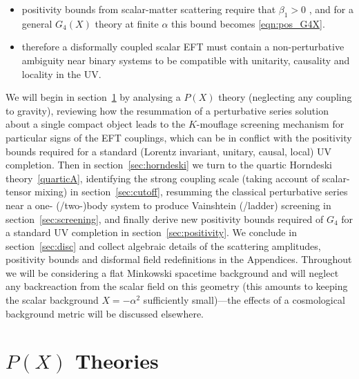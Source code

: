\documentclass[11pt]{article}
\begin{document}
\begin{itemize}
\begin{itemize}
\item positivity bounds from scalar-matter scattering require that $\beta_1 > 0$ \cite{deRham:2021fpu}, and for a general $G_4 (X)$ theory at finite $\alpha$ this bound becomes \eqref{eqn:pos_G4X}.

\item therefore a disformally coupled scalar EFT must contain a non-perturbative ambiguity near binary systems to be compatible with unitarity, causality and locality in the UV. 

\end{itemize} 

\end{itemize} 


We will begin in section~\ref{sec:PX} by analysing a $P(X)$ theory (neglecting any coupling to gravity), reviewing how the resummation of a perturbative series solution about a single compact object leads to the $K$-mouflage screening mechanism for particular signs of the EFT couplings, which can be in conflict with the positivity bounds required for a standard (Lorentz invariant, unitary, causal, local) UV completion.
% 
Then in section~\ref{sec:horndeski} we turn to the quartic Horndeski theory~\eqref{quarticA}, identifying the strong coupling scale (taking account of scalar-tensor mixing) in section~\ref{sec:cutoff}, resumming the classical perturbative series near a one- (/two-)body system to produce Vainshtein (/ladder) screening in section~\ref{sec:screening}, and finally derive new positivity bounds required of $G_4$ for a standard UV completion in section~\ref{sec:positivity}. We conclude in section~\ref{sec:disc} and collect algebraic details of the scattering amplitudes, positivity bounds and disformal field redefinitions in the Appendices.
Throughout we will be considering a flat Minkowski spacetime background and will neglect any backreaction from the scalar field on this geometry (this amounts to keeping the scalar background $X = -\alpha^2$ sufficiently small)---the effects of a cosmological background metric will be discussed elsewhere.  


\section{$P(X)$ Theories}
\label{sec:PX}

%
%
\end{document}
